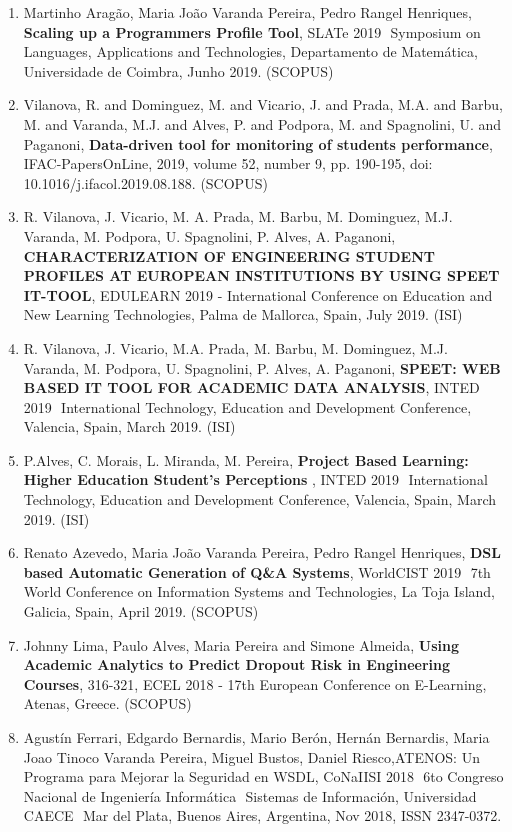 \documentclass[11pt]{article}
\begin{document}
\begin{enumerate}
\item {Martinho Aragão, Maria João Varanda Pereira, Pedro Rangel Henriques, {\bf{ Scaling up a Programmers Profile Tool}},  SLATe 2019  Symposium on Languages, Applications and Technologies, Departamento de Matemática, Universidade de Coimbra, Junho 2019. (SCOPUS)}

\item {Vilanova, R. and Dominguez, M. and Vicario, J. and Prada, M.A. and Barbu, M. and Varanda, M.J. and Alves, P. and Podpora, M. and Spagnolini, U. and Paganoni, {\bf{ Data-driven tool for monitoring of students performance}}, IFAC-PapersOnLine, 2019, volume 52, number 9, pp. 190-195, doi: 10.1016/j.ifacol.2019.08.188. (SCOPUS)}

\item {R. Vilanova, J. Vicario, M. A. Prada, M. Barbu, M. Dominguez, M.J. Varanda, M. Podpora, U. Spagnolini, P. Alves, A. Paganoni, {\bf{ CHARACTERIZATION OF ENGINEERING STUDENT PROFILES AT EUROPEAN INSTITUTIONS BY USING SPEET IT-TOOL}}, EDULEARN 2019 - International Conference on Education and New Learning Technologies, Palma de Mallorca, Spain, July 2019. (ISI)}

\item {R. Vilanova, J. Vicario, M.A. Prada, M. Barbu, M. Dominguez, M.J. Varanda, M. Podpora, U. Spagnolini, P. Alves, A. Paganoni, {\bf{ SPEET: WEB BASED IT TOOL FOR ACADEMIC DATA ANALYSIS}}, INTED 2019  International Technology, Education and Development Conference, Valencia, Spain, March 2019. (ISI)}

\item {P.Alves, C. Morais, L. Miranda, M. Pereira, {\bf{ Project Based Learning: Higher Education Student's Perceptions}} , INTED 2019  International Technology, Education and Development Conference, Valencia, Spain, March 2019. (ISI)}

\item {Renato Azevedo, Maria João Varanda Pereira, Pedro Rangel Henriques, {\bf{ DSL based Automatic Generation of Q\&A Systems}},  WorldCIST 2019  7th World Conference on Information Systems and Technologies, La Toja Island, Galicia, Spain, April 2019. (SCOPUS)}

\item {Johnny Lima, Paulo Alves, Maria Pereira and Simone Almeida, {\bf{ Using Academic Analytics to Predict Dropout Risk in Engineering Courses}},  316-321, ECEL 2018 - 17th European Conference on E-Learning, Atenas, Greece. (SCOPUS)}

\item {Agustín Ferrari, Edgardo Bernardis, Mario Berón, Hernán Bernardis, Maria Joao Tinoco Varanda Pereira, Miguel Bustos, Daniel Riesco,ATENOS: Un Programa para Mejorar la Seguridad en WSDL, CoNaIISI 2018  6to Congreso Nacional de Ingeniería Informática  Sistemas de Información, Universidad CAECE  Mar del Plata, Buenos Aires, Argentina, Nov 2018, ISSN 2347-0372.}


\end{enumerate}
\end{document}
